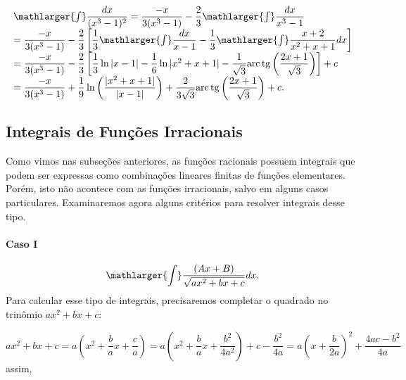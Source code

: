 \cleardoublepage\documentclass[../main.tex]{subfiles}
\begin{document}
\begin{ex}
\begin{compactenum}[a)]
\begin{solution}
\[ \begin{array}{lll} \mathlarger{\int}\dfrac{dx}{(x^3-1)^2} = \dfrac{-x}{3(x^3-1)} -\dfrac{2}{3} \mathlarger{\int}\dfrac{dx}{x^3-1}\\  =\dfrac{-x}{3(x^3-1)} -\dfrac{2}{3}\left[ \dfrac{1}{3}\mathlarger{\int}\dfrac{dx}{x-1} -\dfrac{1}{3}\mathlarger{\int}\dfrac{x+2}{x^2+x+1}dx\right]\\  =\dfrac{-x}{3(x^3-1)} -\dfrac{2}{3}\left[ \dfrac{1}{3}\ln |x-1| -\dfrac{1}{6}\ln|x^2+x+1|-\dfrac{1}{\sqrt{3}}{\rm arc\,tg} \left(\dfrac{2x+1}{\sqrt{3}}\right) \right]+c\\  =\dfrac{-x}{3(x^3-1)} +\dfrac{1}{9}\ln \left(\dfrac{|x^2+x+1|}{|x-1|}\right) +\dfrac{2}{3\sqrt{3}}{\rm arc\,tg} \left(\dfrac{2x+1}{\sqrt{3}}\right) +c. \end{array} \]
\end{solution}
\end{compactenum}
\end{ex}
\subsection{Integrais de Funções Irracionais}\hypertarget{FuncIrr}{}
Como vimos nas subseções anteriores, as funções racionais possuem integrais que podem ser expressas como combinações lineares finitas de funções elementares. Porém, isto não acontece com as funções irracionais, salvo em alguns casos particulares. Examinaremos agora alguns critérios para resolver integrais desse tipo.

\paragraph*{Caso I}
\[ \mathlarger{\int} \dfrac{(Ax+B)}{\sqrt{ax^2+bx+c}}dx. \]
Para calcular esse tipo de integrais, precisaremos completar o quadrado no trinômio \(ax^2+bx+c\):

\[ ax^2+bx+c=a\left(x^2+\dfrac{b}{a}x +\dfrac{c}{a}\right) = a\left(x^2+\dfrac{b}{a}x +\dfrac{b^2}{4a^2}\right)+c-\dfrac{b^2}{4a} = a\left(x+ \dfrac{b}{2a}\right)^2 +\dfrac{4ac-b^2}{4a} \]
assim,
\end{document}

